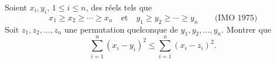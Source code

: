 Soient $x_i, y_i$, $1 \leq i \leq n$, des réels tels que
\[ x_1 \geq x_2 \geq \cdots \geq x_n \quad\text{et}\quad y_1 \geq y_2 \geq \cdots \geq y_n \qquad \text{(IMO 1975)} \]
Soit $z_1, z_2, \ldots, z_n$ une permutation quelconque de $y_1, y_2, \ldots, y_n$. Montrer que
\[ \sum_{i=1}^n (x_i - y_i)^2 \leq \sum_{i=1}^n (x_i - z_i)^2. \]
